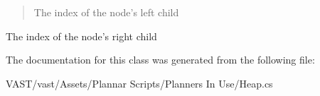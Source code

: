 \begin{quotation}
The index of the node's left child \end{quotation}


The index of the node's right child 

The documentation for this class was generated from the following file\-:\begin{DoxyCompactItemize}
\item 
V\-A\-S\-T/vast/\-Assets/\-Plannar Scripts/\-Planners In Use/Heap.\-cs\end{DoxyCompactItemize}
